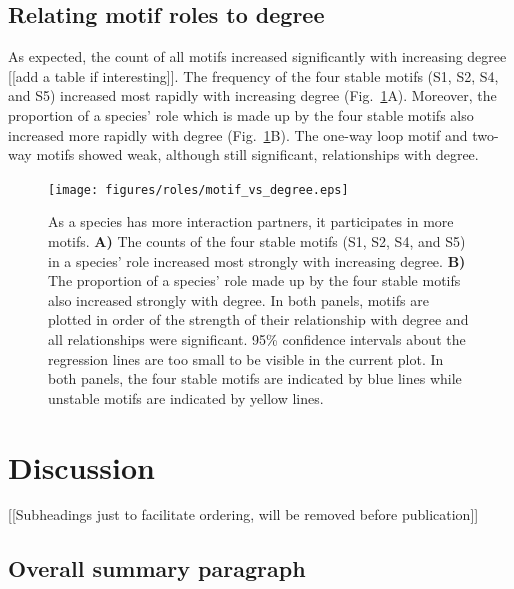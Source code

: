 \documentclass[12pt]{article}
\begin{document}
  \subsection*{Relating motif roles to degree}

    As expected, the count of all motifs increased significantly with increasing degree [[add a table if interesting]].
    The frequency of the four stable motifs (S1, S2, S4, and S5) increased most rapidly with increasing degree (Fig.~\ref{motif_vs_degree}A).
    Moreover, the proportion of a species' role which is made up by the four stable motifs also increased more rapidly with degree (Fig.~\ref{motif_vs_degree}B).
    The one-way loop motif and two-way motifs showed weak, although still significant, relationships with degree.


    \begin{figure}[hb!]
      \caption{As a species has more interaction partners, it participates in more motifs. \textbf{A)} The counts of the four stable motifs (S1, S2, S4, and S5) in a species' role increased most strongly with increasing degree. \textbf{B)} The proportion of a species' role made up by the four stable motifs also increased strongly with degree. In both panels, motifs are plotted in order of the strength of their relationship with degree and all relationships were significant. 95\% confidence intervals about the regression lines are too small to be visible in the current plot. In both panels, the four stable motifs are indicated by blue lines while unstable motifs are indicated by yellow lines.}
      \label{motif_vs_degree}
      \texttt{[image: figures/roles/motif\_vs\_degree.eps]}
      \end{figure}


\section{Discussion}

  [[Subheadings just to facilitate ordering, will be removed before publication]]


  \subsection*{Overall summary paragraph}
\end{document}
